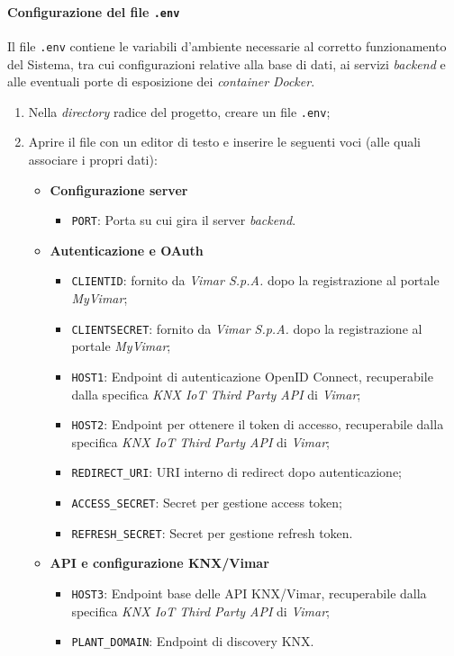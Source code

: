 \documentclass[10pt, letterpaper]{article}
\begin{document}
\paragraph{Configurazione del file \texttt{.env}}
Il file \texttt{.env} contiene le variabili d'ambiente necessarie al corretto funzionamento del Sistema, 
tra cui configurazioni relative alla base di dati, ai servizi \textit{backend} e alle eventuali porte di esposizione dei \textit{container} \textit{Docker}.

\begin{enumerate}
    \item Nella \textit{directory} radice del progetto, creare un file \texttt{.env};
    \item Aprire il file con un editor di testo e inserire le seguenti voci (alle quali associare i propri dati):
\begin{itemize}
    \item \textbf{Configurazione server}
    \begin{itemize}
        \item \texttt{PORT}: Porta su cui gira il server \textit{backend}.
    \end{itemize}

    \item \textbf{Autenticazione e OAuth}
    \begin{itemize}
        \item \texttt{CLIENTID}: fornito da \textit{Vimar S.p.A.} dopo la registrazione al portale \textit{MyVimar};
        \item \texttt{CLIENTSECRET}: fornito da \textit{Vimar S.p.A.} dopo la registrazione al portale \textit{MyVimar};
        \item \texttt{HOST1}: Endpoint di autenticazione OpenID Connect, recuperabile dalla specifica \textit{KNX IoT Third Party API} di \textit{Vimar};
        \item \texttt{HOST2}: Endpoint per ottenere il token di accesso, recuperabile dalla specifica \textit{KNX IoT Third Party API} di \textit{Vimar};
        \item \texttt{REDIRECT\_URI}: URI interno di redirect dopo autenticazione;
        \item \texttt{ACCESS\_SECRET}: Secret per gestione access token;
        \item \texttt{REFRESH\_SECRET}: Secret per gestione refresh token.
    \end{itemize}

    \item \textbf{API e configurazione KNX/Vimar}
    \begin{itemize}
        \item \texttt{HOST3}: Endpoint base delle API KNX/Vimar, recuperabile dalla specifica \textit{KNX IoT Third Party API} di \textit{Vimar};
        \item \texttt{PLANT\_DOMAIN}: Endpoint di discovery KNX.
    \end{itemize}


\end{itemize}
\end{enumerate}
\end{document}
